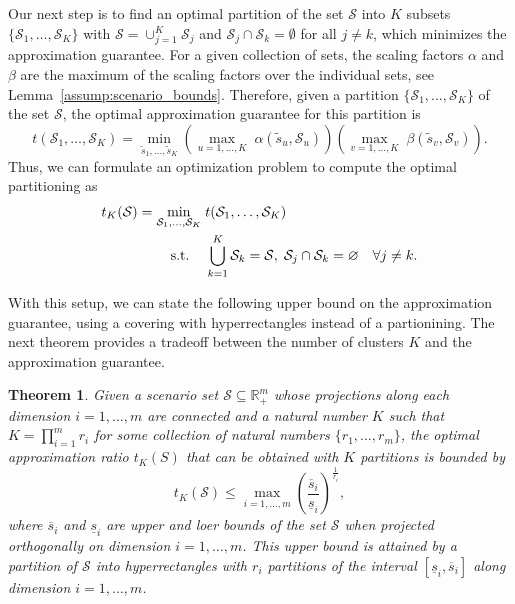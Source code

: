 \documentclass{article}
\newtheorem{theorem}{Theorem}[section]
\newcommand{\mS}{\mathcal{S}}
\newcommand{\newscen}[1]{\tilde{s}_{#1}}%
\begin{document}
Our next step is to find an optimal partition of the set \(\mathcal{S}\) into \(K\) subsets $\{\mS_1,\ldots,\mS_K\}$ with \(\mS=\cup_{j=1}^K \mS_j\) and \(\mS_{j}\cap \mS_{k} =\emptyset\) for
all \(j\neq k\), which minimizes the approximation guarantee.
For a given collection of sets, the scaling factors \(\alpha\) and \(\beta\) are the maximum of the scaling factors over the individual sets, see Lemma~\ref{assump:scenario_bounds}.
Therefore, given a partition \(\{\mS_1,\dots,\mS_K\}\) of the set \(\mS\), the optimal approximation guarantee for this partition is 
\[
	t(\mS_1,\dots,\mS_K) = \min_{\newscen{1},\dots,\newscen{K}}\left(\max_{u=1,\dots,K} \;\alpha(\newscen{u}, \mS_u)\right) \left(\max_{v=1,\dots,K} \;\beta(\newscen{v},\mS_v)\right).
\]
Thus, we can formulate an optimization problem to compute the optimal partitioning as 
\begin{align}
	\label{prob:opt_partition}
	t_K(\mS) = \min_{\mS_1,\dots,\mS_K} &\; t(\mS_1,\dots,\mS_K)\\
	\text{s.t.} \hspace{0.3cm} &\; \bigcup_{k=1}^{K} \mS_k = \mathcal{S},\; \mS_j \cap \mS_k = \varnothing \quad \forall j \neq k.
\end{align}

With this setup, we can state the following upper bound on the approximation guarantee, using a covering with hyperrectangles instead of a partionining.
The next theorem provides a tradeoff between the number of clusters $K$ and the approximation guarantee.
\begin{theorem}
	\label{thm:approx_bound}
	Given a scenario set \(\mS \subseteq \mathbb{R}_{+}^m\) whose
        projections along each dimension \(i=1,\dots,m\) are connected
        and a natural number \(K\) such that \(K =
        \prod_{i=1}^{m}r_i\) for some collection of natural numbers
        \(\{r_1,\dots,r_m\}\), the optimal approximation ratio
        \(t_K(S)\) that can be obtained with \(K\) partitions is bounded by
	\[
	t_K(\mS) \leq \max_{i=1,\dots,m}\left(\frac{\overline{s}_i}{\underline{s}_i}\right)^{\frac{1}{r_i}},
	\]
	where \(\overline{s}_i\) and \(\underline{s}_i\) are upper and
        loer bounds of the set \(\mS\) when projected orthogonally on dimension \(i=1,\ldots,m\). 
	This upper bound is attained by a partition of \(\mS\) into hyperrectangles with \(r_i\) partitions of the interval \([\underline{s}_i,\overline{s}_i]\) along dimension \(i=1,\ldots,m\). 
\end{theorem}
\end{document}
